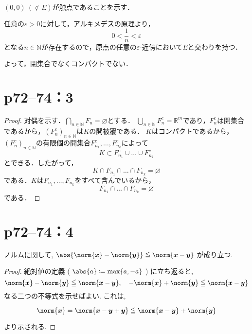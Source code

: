 \documentclass[a4paper,10pt,fleqn]{ltjsarticle}
\begin{document}
\begin{tleftbar}
    $(0,0)~(\notin E)$が触点であることを示す．

    任意の$\varepsilon >0$に対して，アルキメデスの原理より，
    \[
        0 < \frac{1}{n} < \varepsilon
    \]
    となる$n \in \mathbb{N}$が存在するので，原点の任意の$\varepsilon$-近傍において$E$と交わりを持つ．

    よって，閉集合でなくコンパクトでない．
\end{tleftbar}


\newpage
\section*{p72--74：3}

\begin{leftbar}
    \begin{proof}
        対偶を示す．$\bigcap_{n \in \mathbb{N}}F_n = \varnothing$とする．
        $\bigcup_{n \in \mathbb{N}}F_n^c = \mathbb{R}^m$であり，$F_n^c$は開集合であるから，$(F_n^c)_{n \in \mathbb{N}}$は$K$の開被覆である．
        $K$はコンパクトであるから，$(F_n^c)_{n \in \mathbb{N}}$の有限個の開集合$F_{n_1}^c,\ldots,F_{n_k}^c$によって
        \[
            K \subset F_{n_1}^c \cup \ldots \cup F_{n_k}^c
        \]
        とできる．したがって，
        \[
            K \cap F_{n_1} \cap \ldots \cap F_{n_k} = \varnothing
        \]
        である．$K$は$F_{n_1},\ldots,F_{n_k}$をすべて含んでいるから，
        \[
            F_{n_1} \cap \ldots \cap F_{n_k} = \varnothing
        \]
        である．
    \end{proof}
\end{leftbar}

\newpage

\section*{p72--74：4}


ノルムに関して, $\abs{\norm{ \bm{x}  }- \norm{ \bm{y} } } \leq \norm{ \bm{x} - \bm{y} }$ が成り立つ.


\begin{proof}
    絶対値の定義 ( $\abs{a} \coloneqq \max \{ a , -a \}$ ) に立ち返ると,
    \[
        \norm{ \bm{x}  }- \norm{ \bm{y} } \leq \norm{ \bm{x} - \bm{y} } ,\quad  - \norm{ \bm{x} } + \norm{ \bm{y} } \leq \norm{ \bm{x} - \bm{y} }
    \]
    なる二つの不等式を示せばよい. これは,

    \[
        \norm{ \bm{x} } = \norm{ \bm{x} - \bm{y} + \bm{y} } \leq \norm{ \bm x - \bm y } + \norm{ \bm{y} }
    \]

    より示される.
\end{proof}
\end{document}
